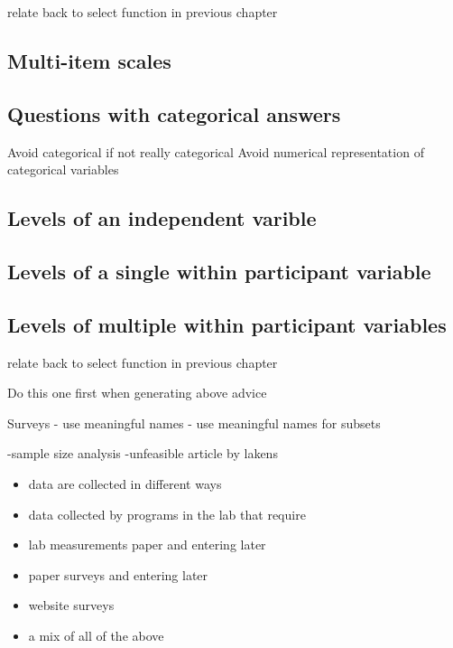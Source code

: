 \documentclass[
]{krantz}
\providecommand{\tightlist}{%
  \setlength{\itemsep}{0pt}\setlength{\parskip}{0pt}}
\begin{document}
relate back to select function in previous chapter

\hypertarget{multi-item-scales}{%
\subsection{Multi-item scales}\label{multi-item-scales}}

\hypertarget{questions-with-categorical-answers}{%
\subsection{Questions with categorical answers}\label{questions-with-categorical-answers}}

Avoid categorical if not really categorical
Avoid numerical representation of categorical variables

\hypertarget{levels-of-an-independent-varible}{%
\subsection{Levels of an independent varible}\label{levels-of-an-independent-varible}}

\hypertarget{levels-of-a-single-within-participant-variable}{%
\subsection{Levels of a single within participant variable}\label{levels-of-a-single-within-participant-variable}}

\hypertarget{levels-of-multiple-within-participant-variables}{%
\subsection{Levels of multiple within participant variables}\label{levels-of-multiple-within-participant-variables}}

relate back to select function in previous chapter

Do this one first when generating above advice

Surveys - use meaningful names
- use meaningful names for subsets

-sample size analysis
-unfeasible article by lakens

\begin{itemize}
\tightlist
\item
  data are collected in different ways
\item
  data collected by programs in the lab that require
\item
  lab measurements paper and entering later
\item
  paper surveys and entering later
\item
  website surveys
\item
  a mix of all of the above
\end{itemize}
\end{document}

